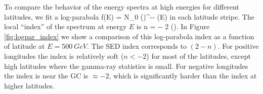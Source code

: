 To compare the behavior of the energy spectra at high energies for different latitudes, 
we fit a log-parabola
 \be
 f(E) = N_0 \left(\right)^{-\alpha - \beta \ln(E)}
 \ee
in each latitude stripe. The local ``index'' of the spectrum at energy $E$ is
 \be 
n \equiv {} = -\alpha - 2 \beta \ln\left(\right).
 \ee
In Figure \ref{fig:logpar_index} we show a comparison of this log-parabola index as a function of latitude at $E = \SI{500}{GeV}$. 
 
The SED index corresponds to $(2 - n)$.
For positive longitudes the index is relatively soft ($n < -2$) for most of the latitudes, 
except high latitudes where the gamma-ray statistics is small.
For negative longitudes the index is near the GC is $\approx -2$, 
which is significantly harder than the index at higher latitudes.
